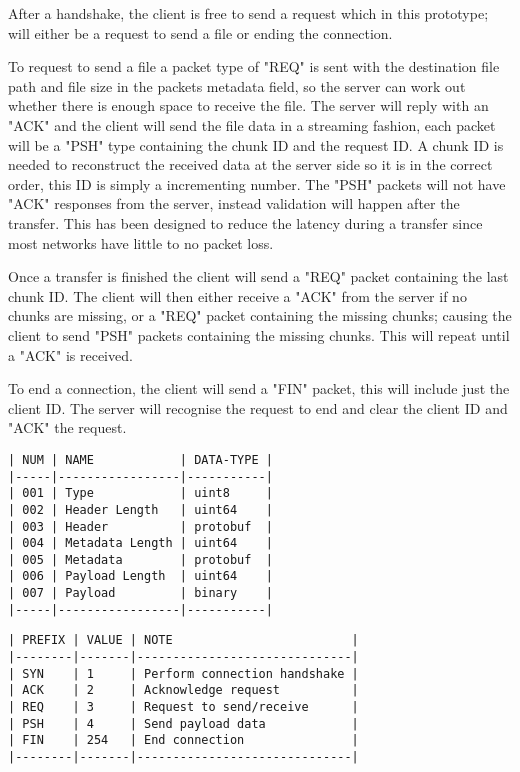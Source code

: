After a handshake, the client is free to send a request which in this prototype; will either be a request to send a file or ending the connection.

To request to send a file a packet type of "REQ" is sent with the destination file path and file size in the packets metadata field, so the server can work out whether there is enough space to receive the file. The server will reply with an "ACK" and the client will send the file data in a streaming fashion, each packet will be a "PSH" type containing the chunk ID and the request ID. A chunk ID is needed to reconstruct the received data at the server side so it is in the correct order, this ID is simply a incrementing number. The "PSH" packets will not have "ACK" responses from the server, instead validation will happen after the transfer. This has been designed to reduce the latency during a transfer since most networks have little to no packet loss.

Once a transfer is finished the client will send a "REQ" packet containing the last chunk ID. The client will then either receive a "ACK" from the server if no chunks are missing, or a "REQ" packet containing the missing chunks; causing the client to send "PSH" packets containing the missing chunks. This will repeat until a "ACK" is received.

To end a connection, the client will send a "FIN" packet, this will include just the client ID. The server will recognise the request to end and clear the client ID and "ACK" the request.

\FloatBarrier

\begin{lstlisting}[float,caption={Prototype One Packet Fields},label=p1d-packet-fields]
| NUM | NAME            | DATA-TYPE |
|-----|-----------------|-----------|
| 001 | Type            | uint8     |
| 002 | Header Length   | uint64    |
| 003 | Header          | protobuf  |
| 004 | Metadata Length | uint64    |
| 005 | Metadata        | protobuf  |
| 006 | Payload Length  | uint64    |
| 007 | Payload         | binary    |
|-----|-----------------|-----------|
\end{lstlisting}

\begin{lstlisting}[float,caption={Prototype One Packet Types},label=p1d-packet-types]
| PREFIX | VALUE | NOTE                         |
|--------|-------|------------------------------|
| SYN    | 1     | Perform connection handshake |
| ACK    | 2     | Acknowledge request          |
| REQ    | 3     | Request to send/receive      |
| PSH    | 4     | Send payload data            |
| FIN    | 254   | End connection               |
|--------|-------|------------------------------|
\end{lstlisting}

